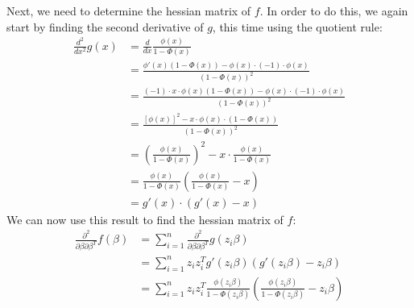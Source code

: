 Next, we need to determine the hessian matrix of $f$. In order to do this,
we again start by finding the second derivative of $g$, this time
using the quotient rule:
\begin{equation}
    \begin{split}
        \frac{d^2}{dx^2}g(x)
        & = \frac{d}{dx} \frac{\phi(x)}{1 - \Phi(x)} \\
        & = \frac{\phi'(x)(1 - \Phi(x)) - \phi(x) \cdot (-1) \cdot \phi(x)}
        {(1 - \Phi(x))^2} \\
        & = \frac{(-1) \cdot x \cdot \phi(x)(1 - \Phi(x)) - \phi(x) \cdot (-1) \cdot \phi(x)}
        {(1 - \Phi(x))^2} \\
        & = \frac{[\phi(x)]^2 - x \cdot \phi(x) \cdot (1 - \Phi(x))}{(1 - \Phi(x))^2} \\
        & = \left(\frac{\phi(x)}{1 - \Phi(x)}\right)^2 - x \cdot \frac{\phi(x)}{1 - \Phi(x)} \\
        & = \frac{\phi(x)}{1 - \Phi(x)} \left( \frac{\phi(x)}{1 - \Phi(x)} - x \right)  \\
        & = g'(x) \cdot (g'(x) - x)
    \end{split}
\end{equation}
We can now use this result to find the hessian matrix of $f$:
\begin{equation}
    \begin{split}
        \frac{\partial^2}{\partial \beta \partial \beta^T} f(\beta)
        & = \sum_{i=1}^n
        \frac{\partial^2}{\partial \beta \partial \beta^T} g(z_i \beta)\\
        & = \sum_{i=1}^n z_i z_i^T g'(z_i \beta)(g'(z_i \beta) - z_i \beta)\\
        & = \sum_{i=1}^n z_i z_i^T
        \frac{\phi(z_i \beta)}{1 - \Phi(z_i \beta)} \left( \frac{\phi(z_i \beta)}{1 - \Phi(z_i \beta)} - z_i \beta \right)  \\
    \end{split}
\end{equation}

\newpage